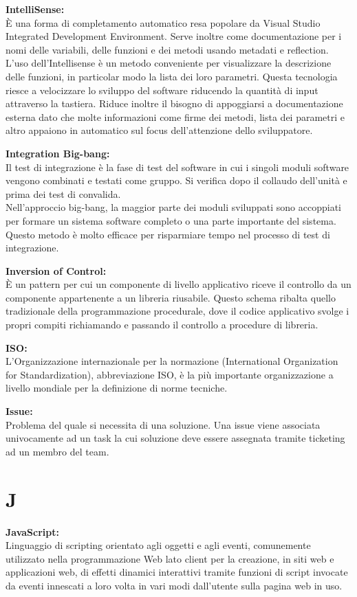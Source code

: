\documentclass[a4paper, oneside, openany, dvipsnames, table]{article}
\begin{document}
\textbf{IntelliSense:}\\	\`E una forma di completamento automatico resa popolare da Visual Studio Integrated Development Environment.
 Serve inoltre come documentazione per i nomi delle variabili, delle funzioni e dei metodi usando  metadati e reflection. L'uso dell'Intellisense è un metodo conveniente per visualizzare la descrizione delle funzioni, in particolar modo la lista dei loro parametri. Questa tecnologia riesce a velocizzare  lo sviluppo del software riducendo la quantità di input attraverso la tastiera.  Riduce inoltre il bisogno di appoggiarsi a documentazione esterna dato che molte informazioni come firme dei metodi, lista dei parametri e altro appaiono in automatico sul focus dell'attenzione dello sviluppatore.

\textbf{Integration Big-bang:}\\Il test di integrazione è la fase di test del software in cui i singoli 
moduli software vengono combinati e testati come gruppo. Si verifica dopo il collaudo dell'unità e prima 
dei test di convalida.
\\Nell'approccio big-bang, la maggior parte dei moduli sviluppati sono accoppiati per formare un 
sistema software completo o una parte importante del sistema.
 Questo metodo è molto efficace per risparmiare tempo nel processo di test di integrazione. 

\textbf{Inversion of Control:}\\	\`E un pattern per cui un componente di livello applicativo riceve il controllo da un componente appartenente a un libreria riusabile. Questo schema ribalta quello tradizionale della programmazione procedurale, dove il codice applicativo svolge i propri compiti richiamando e passando il controllo a procedure di libreria.

\textbf{ISO:}\\L'Organizzazione internazionale per la normazione 
(International Organization for Standardization), abbreviazione ISO, è la più importante organizzazione a livello mondiale per la definizione di norme tecniche.

\textbf{Issue:}\\ Problema del quale si necessita di una soluzione. Una issue viene associata univocamente ad un task la cui soluzione deve essere assegnata tramite ticketing ad un membro del team.

\newpage
\section{J}
\textbf{JavaScript:}\\	Linguaggio di scripting orientato agli oggetti e agli eventi, comunemente utilizzato nella programmazione Web lato client per la creazione, in siti web e applicazioni web, di effetti dinamici interattivi tramite funzioni di script invocate da eventi innescati a loro volta in vari modi dall'utente sulla pagina web in uso.
\end{document}
